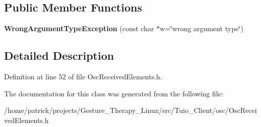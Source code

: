 \subsection*{Public Member Functions}
\begin{DoxyCompactItemize}
\item 
\mbox{\label{classosc_1_1_wrong_argument_type_exception_a0fb4fa9268737151877cd482adcb3e3a}} 
{\bfseries Wrong\+Argument\+Type\+Exception} (const char $\ast$w=\char`\"{}wrong argument type\char`\"{})
\end{DoxyCompactItemize}


\subsection{Detailed Description}


Definition at line 52 of file Osc\+Received\+Elements.\+h.



The documentation for this class was generated from the following file\+:\begin{DoxyCompactItemize}
\item 
/home/patrick/projects/\+Gesture\+\_\+\+Therapy\+\_\+\+Linux/src/\+Tuio\+\_\+\+Client/osc/Osc\+Received\+Elements.\+h\end{DoxyCompactItemize}
